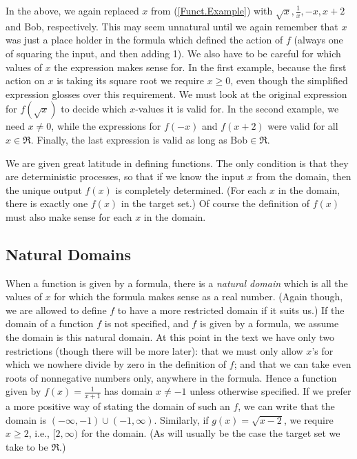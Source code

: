 In the above, we again replaced $x$ from (\ref{Funct.Example})
with $\sqrt{x},\frac1x,-x,x+2$ and Bob, respectively.
This may seem unnatural until we again remember that $x$
was just a place holder in the formula which defined the
action of $f$ (always one of 
squaring the input, and then adding 1).  We also have to be careful
for which values of $x$ the expression makes sense for.  In 
the first example, because the first action on $x$ is
taking its square root we require $x\ge0$, even though the simplified
expression glosses over this requirement. We must look
at the original expression for $f\left(\sqrt{x}\right)$ to decide
which $x$-values it is valid for.  In the second example, we need
$x\ne0$, while the expressions for $f(-x)$ and $f(x+2)$ were
valid for all $x\in\Re$.  Finally, the last expression is
valid as long as $\text{Bob}\in\Re$.

We are given great latitude in defining functions.
The only condition is that they are deterministic processes,
so that if we know the input $x$ from the domain, then the
unique output $f(x)$ is completely determined.  
(For each $x$ in the domain, there is exactly
one $f(x)$ in the target set.)  Of course the
definition of $f(x)$ must also make sense for each $x$
in the domain.  

\subsection{Natural Domains}
When a function is given by a formula, 
there is a {\it natural domain} which is all the values
of $x$ for which the formula makes sense as a real number.  
(Again though,
we are allowed to define $f$ to have a more restricted
domain if it suits us.)  If the domain of a function $f$ is not
specified, and $f$ is given by a formula, 
we assume the domain is this natural domain.  At this point in the text
we have only two restrictions (though there will be more later):
that we must only allow $x$'s for which we nowhere divide by
zero in the definition of $f$; and that we can take even
roots of nonnegative numbers only, anywhere in the formula.
Hence a function given
by $f(x)=\frac1{x+1}$ has domain $x\ne-1$ unless otherwise
specified.  If we prefer a more positive way of stating the
domain of such an $f$, we can write that the domain is
$(-\infty,-1)\cup(-1,\infty)$.  Similarly, if $g(x)=\sqrt{x-2}$,
we require $x\ge2$, i.e., $[2,\infty)$ for the domain.
(As will usually be the case the target set we take to
be $\Re$.)

